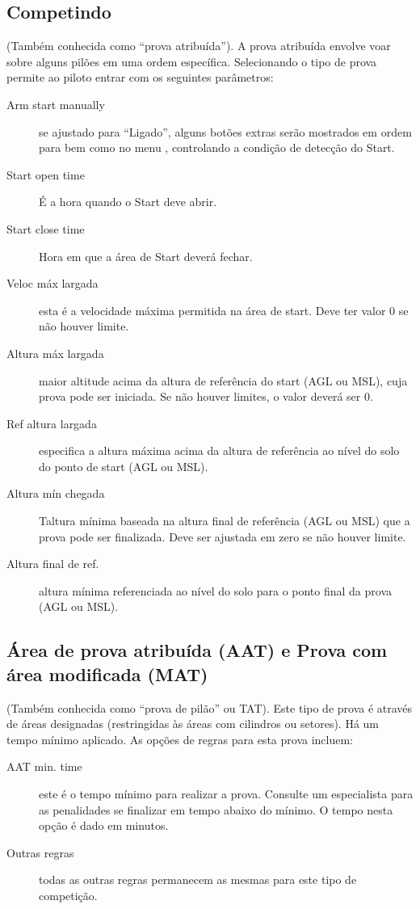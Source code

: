\subsection*{Competindo}
(Também conhecida como “prova atribuída”).  A prova atribuída envolve voar sobre alguns pilões em uma ordem específica.  Selecionando o tipo de prova permite ao piloto entrar com os seguintes parâmetros: 
  \begin{description}
  \item [Arm start manually] se ajustado para “Ligado”, alguns botões extras serão mostrados em ordem para  bem como  no menu , controlando a condição de detecção do Start.
  \item [Start open time] É a hora quando o Start deve abrir. 
  \item [Start close time] Hora em que a área de Start deverá fechar.
  \item [Veloc máx largada] esta é a velocidade máxima permitida na área de start.  Deve ter valor 0 se não houver limite.
  \item [Altura máx largada] maior altitude acima da altura de referência do start (AGL ou MSL), cuja prova pode ser iniciada.  Se não houver limites, o valor deverá ser 0.
  \item [Ref altura largada] especifica a altura máxima acima da altura de referência ao nível do solo do ponto de start (AGL ou MSL).
  \item [Altura mín chegada] Taltura mínima baseada na altura final de referência (AGL ou MSL) que a prova pode ser finalizada.  Deve ser ajustada em zero se não houver limite. 
  \item [Altura final de ref.] altura mínima referenciada ao nível do solo para o ponto final da prova (AGL ou MSL).
  \end{description}
  
\subsection*{Área de prova atribuída (AAT) e Prova com área modificada (MAT)}
(Também conhecida como “prova de pilão” ou TAT).  Este tipo de prova é através de áreas designadas (restringidas às áreas com cilindros ou setores).  Há um tempo mínimo aplicado.  As opções de regras para esta prova incluem:
  \begin{description}
  \item [AAT min. time]  este é o tempo mínimo para realizar a prova. Consulte um especialista para as penalidades se finalizar em tempo abaixo do mínimo.  O tempo nesta opção é dado em minutos.
  \item [Outras regras] todas as outras regras permanecem as mesmas para este tipo de competição.
  \end{description}


